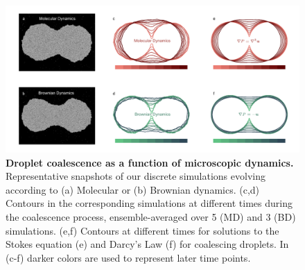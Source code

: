 \documentclass[%
reprint,
amsmath,amssymb,
aps,
]{revtex4-2}
\begin{document}
	\begin{figure}[ht]
		\centering
		\includegraphics[width=\textwidth]{Figure1.pdf}
		\caption{\textbf{Droplet coalescence as a function of microscopic dynamics.} Representative snapshots of our discrete simulations evolving according to (a) Molecular or (b) Brownian dynamics. (c,d) Contours in the corresponding simulations at different times during the coalescence process, ensemble-averaged over 5 (MD) and 3 (BD) simulations. (e,f) Contours at different times for solutions to the Stokes equation (e) and Darcy's Law (f) for coalescing droplets. In (c-f) darker colors are used to represent later time points.}
		\label{fig:Contours}
	\end{figure}
	
\end{document}
